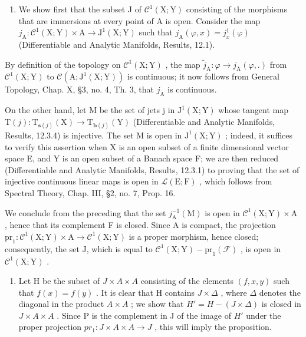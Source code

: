 \begin{enumerate}
\def\labelenumi{\alph{enumi})}
\tightlist
\item
  We show first that the subset J of \(\mathcal{C}^{1}(\mathrm{X};\mathrm{Y})\) consisting of the morphisms that are immersions at every point of A is open. Consider the map \(j_{\mathrm{A}}:\mathcal{C}^{1}(\mathrm{X};\mathrm{Y})\times\mathrm{A}\to\mathrm{J}^{1}(\mathrm{X};\mathrm{Y})\) such that \(j_{\mathrm{A}}(\varphi,x)=j_{x}^{1}(\varphi)\) (Differentiable and Analytic Manifolds, Results, 12.1).
\end{enumerate}

By definition of the topology on \(\mathcal{C}^1 (\mathrm{X};\mathrm{Y})\) , the map \(\tilde{j}_{\mathrm{A}}:\varphi \to j_{\mathrm{A}}(\varphi ,.)\) from \(\mathcal{C}^1 (\mathrm{X};\mathrm{Y})\) to \(\mathcal{C}(\mathrm{A};\mathrm{J}^1 (\mathrm{X};\mathrm{Y}))\) is continuous; it now follows from General Topology, Chap. X, §3, no. 4, Th. 3, that \(j_{\mathrm{A}}\) is continuous.

On the other hand, let M be the set of jets j in \(\mathrm{J}^{1}(\mathrm{X};\mathrm{Y})\) whose tangent map \(\mathrm{T}(j):\mathrm{T}_{\mathbf{s}(j)}(\mathrm{X})\to\mathrm{T}_{\mathbf{b}(j)}(\mathrm{Y})\) (Differentiable and Analytic Manifolds, Results, 12.3.4) is injective. The set M is open in \(\mathrm{J}^{1}(\mathrm{X};\mathrm{Y})\) ; indeed, it suffices to verify this assertion when X is an open subset of a finite dimensional vector space E, and Y is an open subset of a Banach space F; we are then reduced (Differentiable and Analytic Manifolds, Results, 12.3.1) to proving that the set of injective continuous linear maps is open in \(\mathcal{L}(\mathrm{E};\mathrm{F})\) , which follows from Spectral Theory, Chap. III, §2, no. 7, Prop. 16.

We conclude from the preceding that the set \(j_{\mathrm{A}}^{-1}(\mathrm{M})\) is open in \(\mathcal{C}^{1}(\mathrm{X};\mathrm{Y})\times\mathrm{A}\) , hence that its complement F is closed. Since A is compact, the projection \(\mathrm{pr}_{1}:\mathcal{C}^{1}(\mathrm{X};\mathrm{Y})\times\mathrm{A}\to\mathcal{C}^{1}(\mathrm{X};\mathrm{Y})\) is a proper morphism, hence closed; consequently, the set J, which is equal to \(\mathcal{C}^{1}(\mathrm{X};\mathrm{Y})-\mathrm{pr}_{1}(\mathcal{F})\) , is open in \(\mathcal{C}^{1}(\mathrm{X};\mathrm{Y})\) .

\begin{enumerate}
\def\labelenumi{\alph{enumi})}
\setcounter{enumi}{1}
\tightlist
\item
  Let H be the subset of \(J \times A \times A\) consisting of the elements \((f, x, y)\) such that \(f(x) = f(y)\) . It is clear that H contains \(J \times \Delta\) , where \(\Delta\) denotes the diagonal in the product \(A \times A\) ; we show that \(H' = H - (J \times \Delta)\) is closed in \(J \times A \times A\) . Since P is the complement in J of the image of \(H'\) under the proper projection \(pr_{1}: J \times A \times A \to J\) , this will imply the proposition.
\end{enumerate}

